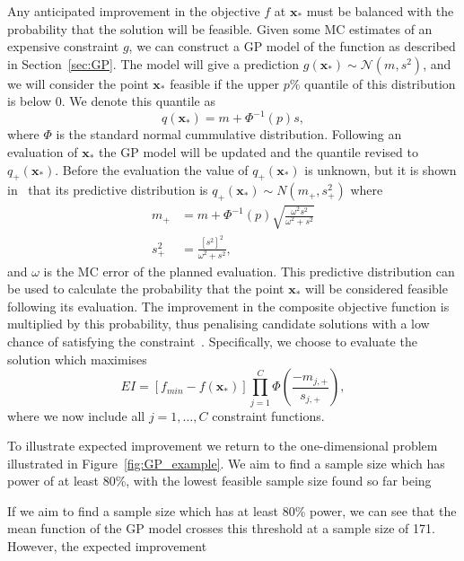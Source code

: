 \documentclass{article} %
\begin{document}
Any anticipated improvement in the objective $f$ at $\mathbf{x}_{*}$ must be balanced with the probability that the solution will be feasible. Given some MC estimates of an expensive constraint $g$, we can construct a GP model of the function as described in Section~\ref{sec:GP}. The model will give a prediction $g(\mathbf{x}_{*}) \sim \mathcal{N}(m, s^{2})$, and we will consider the point $\mathbf{x}_{*}$ feasible if the upper $p$\% quantile of this distribution is below 0. We denote this quantile as
\begin{equation}
q(\mathbf{x}_{*}) = m + \Phi^{-1}(p)s,
\end{equation}
where $\Phi$ is the standard normal cummulative distribution. Following an evaluation of $\mathbf{x}_{*}$ the GP model will be updated and the quantile revised to $q_{+}(\mathbf{x}_{*})$. Before the evaluation the value of $q_{+}(\mathbf{x}_{*})$ is unknown, but it is shown in~\cite{Picheny2014} that its predictive distribution is $q_{+}(\mathbf{x}_{*}) \sim N(m_{+}, s_{+}^{2})$ where
\begin{align}
m_{+} &= m + \Phi^{-1}(p)\sqrt{\frac{\omega^{2}s^{2}}{\omega^{2} + s^{2}}} \\
s_{+}^{2} &= \frac{[s^{2}]^{2}}{\omega^{2} + s^{2}},
\end{align}
and $\omega$ is the MC error of the planned evaluation. This predictive distribution can be used to calculate the probability that the point $\mathbf{x}_{*}$ will be considered feasible following its evaluation. The improvement in the composite objective function is multiplied by this probability, thus penalising candidate solutions with a low chance of satisfying the constraint~\cite{Sasena2002}. Specifically, we choose to evaluate the solution which maximises
\begin{equation}
EI = [f_{min} - f(\mathbf{x}_{*})] \prod_{j=1}^{C} \Phi\left(\frac{-m_{j,+}}{s_{j,+}}\right),
\end{equation}
where we now include all $j = 1, \ldots , C$ constraint functions.

To illustrate expected improvement we return to the one-dimensional problem illustrated in Figure~\ref{fig:GP_example}. We aim to find a sample size which has power of at least 80\%, with the lowest feasible sample size found so far being 

If we aim to find a sample size which has at least 80\% power, we can see that the mean function of the GP model crosses this threshold at a sample size of 171. However, the expected improvement 
\end{document}
